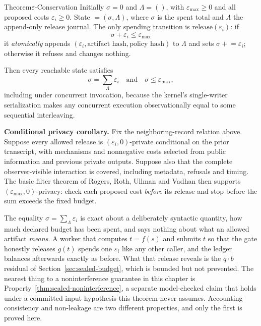 \documentclass[11pt,a4paper]{article}
\theoremstyle{definition}
\begin{document}
\begin{pdclaim}{Theorem}{$\varepsilon$-Conservation}
\label{thm:sealed-conservation}
\setlength{\parskip}{4pt plus 1pt}
Initially $\sigma=0$ and $\Lambda=()$, with $\varepsilon_{\max}\ge0$ and
all proposed costs $\varepsilon_i\ge0$. State $=(\sigma,\Lambda)$, where
$\sigma$ is the spent total and $\Lambda$ the append-only release journal. The only spending
transition is $\mathrm{release}(\varepsilon_i)$: if
\[
\sigma+\varepsilon_i\le\varepsilon_{\max}
\]
it \emph{atomically} appends
$(\varepsilon_i,\text{artifact hash},\text{policy hash})$ to $\Lambda$ and sets
$\sigma\mathrel{+}=\varepsilon_i$; otherwise it refuses and changes nothing.

Then every reachable state satisfies
\[
\sigma=\sum_{\Lambda}\varepsilon_i
\quad\text{and}\quad
\sigma\le\varepsilon_{\max},
\]
including under concurrent invocation, because
the kernel's single-writer serialization makes any concurrent execution
observationally equal to some sequential interleaving.

\textbf{Conditional privacy corollary.} Fix the neighboring-record relation
above. Suppose every allowed release is $(\varepsilon_i,0)$-private conditional
on the prior transcript, with mechanisms and nonnegative costs selected from
public information and previous private outputs. Suppose also that the complete observer-visible interaction is
covered, including metadata, refusals and timing. The basic filter theorem of
Rogers, Roth, Ullman and Vadhan  then supports
$(\varepsilon_{\max},0)$-privacy: check each proposed cost \emph{before} its
release and stop before the sum exceeds the fixed budget.
\end{pdclaim}

The equality $\sigma=\sum_{\Lambda}\varepsilon_i$ is exact about a
deliberately syntactic quantity, how much declared budget has been spent, and
says nothing about what an allowed artifact \emph{means}. A worker that
computes $t=f(s)$ and submits $t$ so that the gate honestly releases $g(t)$
spends one $\varepsilon_i$ like any other caller, and the ledger balances
afterwards exactly as before. What that release reveals is the $q\cdot b$
residual of Section~\ref{sec:sealed-budget}, which is bounded but not
prevented. The nearest thing to a noninterference guarantee in this chapter
is Property~\ref{thm:sealed-noninterference}, a separate model-checked claim
that holds under a committed-input hypothesis this theorem never assumes.
Accounting consistency and non-leakage are two different properties, and only
the first is proved here.
\end{document}
